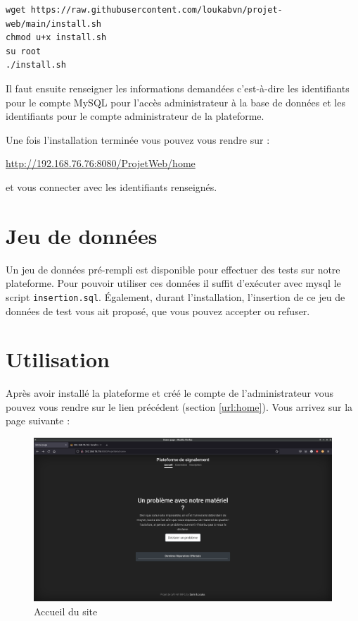 \begin{verbatim}
wget https://raw.githubusercontent.com/loukabvn/projet-web/main/install.sh
chmod u+x install.sh
su root
./install.sh
\end{verbatim}

Il faut ensuite renseigner les informations demandées c'est-à-dire les identifiants pour le
compte MySQL pour l'accès administrateur à la base de données et les identifiants pour le compte
administrateur de la plateforme.

Une fois l'installation terminée vous pouvez vous rendre sur :
\begin{center}
    \label{url:home}
    \url{http://192.168.76.76:8080/ProjetWeb/home}
\end{center}
et vous connecter avec les identifiants renseignés.

\section{Jeu de données}

Un jeu de données pré-rempli est disponible pour effectuer des tests sur notre plateforme.
Pour pouvoir utiliser ces données il suffit d'exécuter avec mysql le script \verb:insertion.sql:.
Également, durant l'installation, l'insertion de ce jeu de données de test vous ait proposé, que
vous pouvez accepter ou refuser.
\newpage

\section{Utilisation}

Après avoir installé la plateforme et créé le compte de l'administrateur vous pouvez vous rendre
sur le lien précédent (section \ref{url:home}). Vous arrivez sur la page suivante :

\begin{figure}[!h]
    \centering
    \includegraphics[width=15cm]{img/home.png}
    \caption{Accueil du site}
\end{figure}

